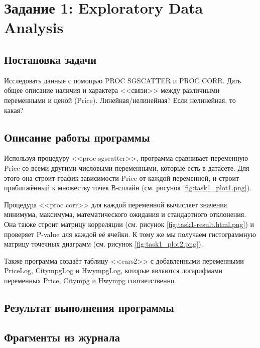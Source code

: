\documentclass[12pt,a4paper]{article}
\begin{document}

  \section{Задание 1: Exploratory Data Analysis}
  \subsection{Постановка задачи}
  Исследовать данные с помощью PROC SGSCATTER и PROC CORR.
  Дать общее описание наличия и характера <<связи>> между различными переменными и ценой (Price).
  Линейная/нелинейная? Если нелинейная, то какая?

  \subsection{Описание работы программы}
  Используя процедуру <<proc sgscatter>>,
  программа сравнивает переменную Price со всеми другими числовыми переменными, которые есть в датасете.
  Для этого она строит график зависимости Price от каждой переменной, и строит приближённый к множеству точек В-сплайн
  (см. рисунок \ref{fig:task1_plot1.png}).

  Процедура <<proc corr>> для каждой переменной вычисляет значения минимума, максимума, математического ожидания и стандартного отклонения.
  Она также строит матрицу корреляции (см. рисунок \ref{fig:task1-result.html.png}) и проверяет P-value для каждой её ячейки.
  К тому же мы получаем гистограммную матрицу точечных диаграмм (см. рисунок \ref{fig:task1_plot2.png}).

  Также программа создаёт таблицу <<cars2>> с добавленными переменными PriceLog, CitympgLog и HwympgLog,
  которые являются логарифмами переменных Price, Citympg и Hwympg соответственно.

  \subsection{Результат выполнения программы}

  \subsection{Фрагменты из журнала}
\end{document}
